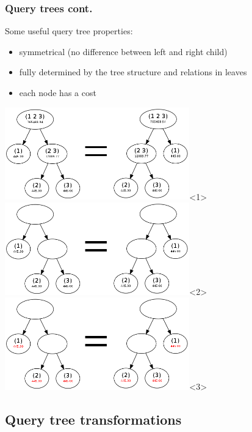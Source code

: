 \documentclass{beamer}
\begin{document}
\begin{frame}
  \frametitle{Query trees cont.}

  Some useful query tree properties:

  \begin{itemize}[<+->]
  \item symmetrical (no difference between left and right child)
  \item fully determined by the tree structure and relations in leaves
  \item each node has a cost
  \end{itemize}

  \begin{center}
    \includegraphics[width=8cm]{qt-symmetrical-1.png}<1>
    \includegraphics[width=8cm]{qt-symmetrical-2.png}<2>
    \includegraphics[width=8cm]{qt-symmetrical-3.png}<3>
  \end{center}

\end{frame}

\subsection{Query tree transformations}

\end{document}
